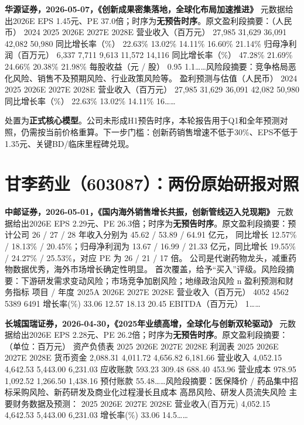 \textbf{华源证券，2026-05-07，《创新成果密集落地，全球化布局加速推进》}
元数据给出2026E EPS 1.45元、PE 37.0倍；时序为\textbf{无预告时序}。原文盈利段摘要：（人民币） 2024 2025 2026E 2027E 2028E 营业收入（百万元） 27,985 31,629 36,091 42,082 50,980 同比增长率（\%） 22.63\% 13.02\% 14.11\% 16.60\% 21.14\% 归母净利润（百万元） 6,337 7,711 9,613 11,572 14,116 同比增长率（\%） 47.28\% 21.69\% 24.66\% 20.38\% 21.98\% 每股收益（元 / 股） 0.95 1.1……风险段摘要：竞争格局恶化风险、销售不及预期风险、行业政策风险等。 盈利预测与估值（人民币） 2024 2025 2026E 2027E 2028E 营业收入（百万元） 27,985 31,629 36,091 42,082 50,980 同比增长率（\%） 22.63\% 13.02\% 14.11\% 16……

\begin{keyinsight}[AStock处理]
处置为\textbf{正式核心模型}。公司未形成H1预告时序，本轮报告用于Q1和全年预测对照，仍需按当前价格重算。下一步门槛：创新药销售增速不低于30\%、EPS不低于1.35元、关键BD/临床里程碑兑现。
\end{keyinsight}

\section{甘李药业（603087）：两份原始研报对照}

\textbf{中邮证券，2026-05-01，《国内海外销售增长共振，创新管线迈入兑现期》}
元数据给出2026E EPS 2.29元、PE 26.3倍；时序为\textbf{无预告时序}。原文盈利段摘要：预计公司 26 / 27 / 28 年收入分别为 45.62 / 53.89 / 64.91 亿元， 同比增长 12.57\% / 18.13\% / 20.45\%；归母净利润为 13.67 / 16.99 / 21.33 亿元，同比增长 19.55\% / 24.27\% / 25.53\%，对应 PE 为 26 / 21 / 17 倍。 公司是代谢药物龙头，减重药物数据优秀，海外市场增长确定性明显。 首次覆盖，给予“买入”评级。风险段摘要：下游研发需求变动风险；市场竞争加剧风险；地缘政治风险 n 盈利预测和财务指标 项目 / 年度 2025A 2026E 2027E 2028E 营业收入（百万元） 4052 4562 5389 6491 增长率(\%) 33.06 12.57 18.13 20.45 EBITDA（百万元） 1……

\textbf{长城国瑞证券，2026-04-30，《2025年业绩高增，全球化与创新双轮驱动》}
元数据给出2026E EPS 2.28元、PE 26.2倍；时序为\textbf{无预告时序}。原文盈利段摘要：（单位：百万元） 资产负债表 2025 2026E 2027E 2028E 利润表 2025 2026E 2027E 2028E 货币资金 2,088.31 4,011.72 4,656.82 6,181.66 营业收入 4,052.15 4,642.53 5,443.00 6,231.03 应收账款 593.23 309.48 688.40 453.96 营业成本 978.95 1,092.52 1,266.50 1,438.16 预付账款 55.48……风险段摘要：医保降价 / 药品集中招标采购风险、新药研发及商业化过程漫长且成本 高昂风险、研发人员流失风险 主要财务数据及预测： 2025 2026E 2027E 2028E 营业收入(百万元) 4,052.15 4,642.53 5,443.00 6,231.03 增长率(\%) 33.06 14.5……

